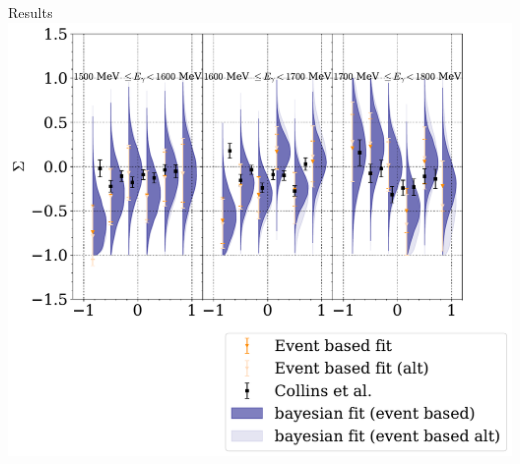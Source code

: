 \documentclass[11pt,aspectratio=169,dvipsnames]{beamer}
\begin{document}
\begin{frame}{Results}
	\centering
	\includegraphics[width=.7\linewidth]{../../bayes/etap_event_based_fit/plots/sigma_etap.pdf}
\end{frame}
\end{document}

